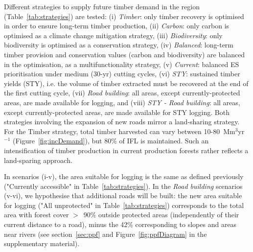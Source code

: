 \documentclass{article}
\begin{document}
Different strategies to supply future timber demand in the region (Table~\ref{tab:strategies}) are tested: (i) \textit{Timber}: only timber recovery is optimised in order to ensure long-term timber production, (ii) \textit{Carbon}: only carbon is optimised as a climate change mitigation strategy, (iii) \textit{Biodiversity}: only biodiversity is optimised as a conservation strategy, (iv) \textit{Balanced}: long-term timber provision and conservation values (carbon and biodiversity) are balanced in the optimisation, as a multifunctionality strategy, (v) \textit{Current}: balanced ES prioritisation under medium (30-yr) cutting cycles, (vi) \textit{STY}: sustained timber yields (STY), i.e. the volume of timber extracted must be recovered at the end of the first cutting cycle, (vii) \textit{Road building}: all areas, except currently-protected areas, are made available for logging, and (viii) \textit{STY - Road building}: all areas, except currently-protected areas, are made available for STY logging. Both strategies involving the expansion of new roads mirror a land-sharing strategy. For the Timber strategy, total timber harvested can vary between 10-80~Mm$^3$yr$^{-1}$ (Figure~\ref{fig:incDemand}), but 80\% of IFL is maintained. Such an intensification of timber production in current production forests rather reflects a land-sparing approach.

In scenarios (i-v), the area suitable for logging is the same as defined previously ("Currently accessible" in Table~\ref{tab:strategies}). In the \textit{Road building} scenarios (v-vi), we hypothesise that additional roads will be built: the new area suitable for logging ("All unprotected" in Table~\ref{tab:strategies}) corresponds to the total area with forest cover $>$~90\% outside protected areas (independently of their current distance to a road), minus the 42\% corresponding to slopes and areas near rivers (see section~\ref{sec:ppf} and Figure~\ref{fig:ppfDiagram} in the supplementary material). 
\end{document}
